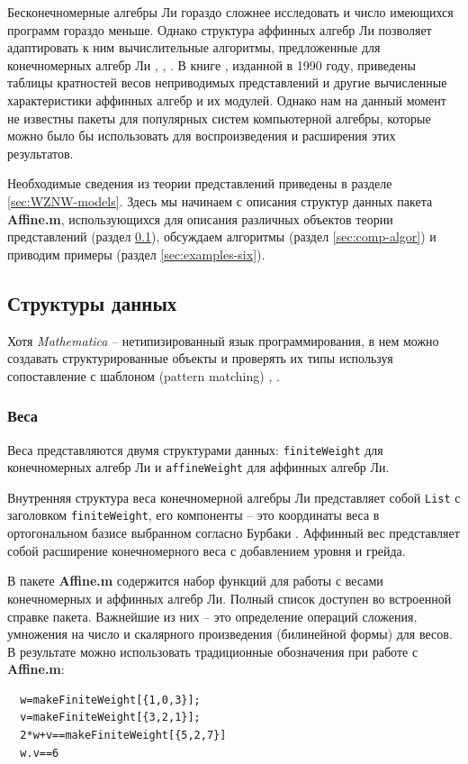 Бесконечномерные алгебры Ли гораздо сложнее исследовать и число имеющихся программ гораздо меньше. 
Однако структура аффинных алгебр Ли позволяет адаптировать к ним вычислительные алгоритмы, предложенные для конечномерных алгебр Ли \cite{Fuchs:1996dd}, \cite{gannon2001algorithms}, \cite{kass1990ala}. В книге \cite{kass1990ala}, изданной в 1990 году, приведены таблицы кратностей весов неприводимых представлений и другие вычисленные характеристики аффинных алгебр и их модулей. Однако нам на данный момент не известны пакеты для популярных систем компьютерной алгебры, которые можно было бы использовать для воспроизведения и расширения этих результатов.


Необходимые сведения из теории представлений приведены в разделе \ref{sec:WZNW-models}. Здесь мы начинаем с описания структур данных пакета  {\bf Affine.m}, использующихся для описания различных объектов теории представлений  (раздел \ref{sec:core-datastructures}), обсуждаем алгоритмы  (раздел \ref{sec:comp-algor}) и приводим примеры  (раздел \ref{sec:examples-six}). 

\subsection{Структуры данных}
\label{sec:core-datastructures} 
Хотя {\it Mathematica} -- нетипизированный язык программирования, в нем можно создавать структурированные объекты и проверять их типы используя сопоставление с шаблоном (pattern matching) \cite{shifrinmathematica}, \cite{maeder2000computer}.
\subsubsection{Веса}
\label{sec:weights}

Веса представляются двумя структурами данных: \lstinline{finiteWeight} для конечномерных алгебр Ли и \lstinline{affineWeight} для аффинных алгебр Ли.

Внутренняя структура веса конечномерной алгебры Ли представляет собой  \lstinline{List} с заголовком \lstinline{finiteWeight}, его компоненты -- это координаты веса в ортогональном базисе выбранном согласно Бурбаки \cite{bourbaki2002lie}.
Аффинный вес представляет собой расширение конечномерного веса с добавлением уровня и грейда. 

В пакете {\bf Affine.m} содержится набор функций для работы с весами конечномерных и аффинных алгебр Ли. Полный список доступен во встроенной справке пакета. Важнейшие из них -- это определение операций сложения, умножения на число и скалярного произведения (билинейной формы) для весов. В результате можно использовать традиционные обозначения при работе с  {\bf Affine.m}:
\begin{lstlisting}
  w=makeFiniteWeight[{1,0,3}];
  v=makeFiniteWeight[{3,2,1}];
  2*w+v==makeFiniteWeight[{5,2,7}]
  w.v==6
\end{lstlisting}

